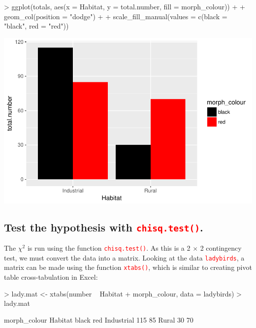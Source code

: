 \documentclass[a4paper,12pt]{article}
\newcommand\code[1]{\textcolor{red}{\texttt{#1}}}
\begin{document}
\begin{shaded}
\begin{Schunk}
\begin{Sinput}
> ggplot(totals, aes(x = Habitat, y = total.number, fill = morph_colour)) +
+   geom_col(position = "dodge") +
+   scale_fill_manual(values = c(black = "black", red = "red"))
\end{Sinput}
\end{Schunk}
\includegraphics{1_Stats_Course_Notes-knitr-008}
\end{shaded}

\subsection{Test the hypothesis with \code{chisq.test()}.}

The $\chi^{2}$ is run using the function \code{chisq.test()}. As this is a 2 $\times$ 2 contingency test, we must convert the data into a matrix. Looking at the data \code{ladybirds}, a matrix can be made using the function \code{xtabs()}, which is similar to creating pivot table cross-tabulation in Excel:

\begin{shaded}
\begin{Schunk}
\begin{Sinput}
> lady.mat <- xtabs(number ~ Habitat + morph_colour, data = ladybirds)
> lady.mat
\end{Sinput}
\begin{Soutput}
            morph_colour
Habitat      black red
  Industrial   115  85
  Rural         30  70
\end{Soutput}
\end{Schunk}
\end{shaded}
\end{document}
